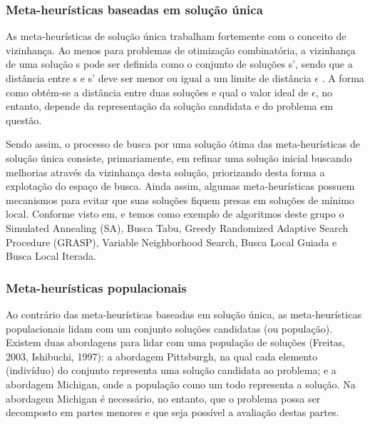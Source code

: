 \subsubsection{Meta-heurísticas baseadas em solução única}
\label{subsec:subc2151}
As meta-heurísticas de solução única trabalham fortemente com o conceito de vizinhança. Ao menos para problemas de otimização combinatória, a vizinhança de uma solução s pode ser definida como o conjunto de soluções s', sendo que a distância entre s e s' deve ser menor ou igual a um limite de distância $\epsilon$ \cite{Talbi2009}. A forma como obtém-se a distância entre duas soluções e qual o valor ideal de $\epsilon$, no entanto, depende da representação da solução candidata e do problema em questão.

Sendo assim, o processo de busca por uma solução ótima das meta-heurísticas de solução única consiste, primariamente, em refinar uma solução inicial buscando melhorias através da vizinhança desta solução, priorizando desta forma a explotação do espaço de busca. Ainda assim, algumas meta-heurísticas possuem mecanismos para evitar que suas soluções fiquem presas em soluções de mínimo local. Conforme visto em\cite{Blum2003}, \cite{Talbi2009} e \cite{Boussaid2013} temos como exemplo de algoritmos deste grupo o Simulated Annealing (SA), Busca Tabu, Greedy Randomized Adaptive Search Procedure (GRASP), Variable Neighborhood Search, Busca Local Guiada e Busca Local Iterada.

\subsubsection{Meta-heurísticas populacionais}
\label{subsec:subc2152}
Ao contrário das meta-heurísticas baseadas em solução única, as meta-heurísticas populacionais lidam com um conjunto soluções candidatas (ou população). Existem duas abordagens para lidar com uma população de soluções \cite{Freitas2003,Ishibuchi1997} (Freitas, 2003, Ishibuchi, 1997): a abordagem Pittsburgh, na qual cada elemento (indivíduo) do conjunto representa uma solução candidata ao problema; e a abordagem Michigan, onde a população como um todo representa a solução. Na abordagem Michigan é necessário, no entanto, que o problema possa ser decomposto em partes menores e que seja possível a avaliação destas partes.

